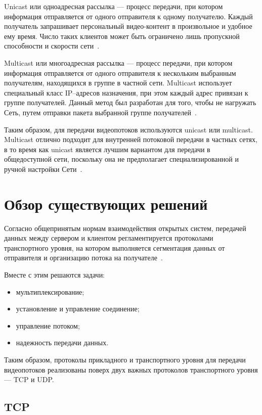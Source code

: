 Unicast или одноадресная рассылка --- процесс передачи, при котором информация отправляется от одного отправителя к одному получателю. Каждый получатель запрашивает персональный видео-контент в произвольное и удобное ему время.
Число таких клиентов может быть ограничено лишь пропускной способности и скорости сети~\cite{method_streaming}.

Multicast или многоадресная рассылка --- процесс передачи, при котором информация отправляется от одного отправителя к нескольким выбранным получателям, находящихся в группе в частной сети.  Multicast использует специальный класс IP--адресов назначения, при этом каждый адрес привязан к группе получателей. Данный метод был разработан для того, чтобы не нагружать Сеть, путем отправки пакета выбранной группе получателей~\cite{method_streaming}. 

Таким образом, для передачи видеопотоков используются unicast или multicast. Multicast отлично подходит для внутренней потоковой передачи в частных сетях, в то время как unicast является лучшим вариантом для передачи в общедоступной сети, поскольку она не предполагает специализированной и ручной настройки Сети~\cite{differece_method_streaming_1}.

\chapter{Обзор существующих решений}

Согласно общепринятым нормам взаимодействия открытых систем, передачей данных между сервером и клиентом регламентируется протоколами транспортного уровня, на котором выполняется сегментация данных от отправителя и организацию потока на получателе~\cite{tcp_ip_reilly,  network_tanenbaum}. 

Вместе с этим решаются задачи:
\begin{itemize}
	\item мультиплексирование;
	\item установление и управление соединение;
	\item управление потоком;
	\item надежность передачи данных.
\end{itemize}

Таким образом, протоколы прикладного и транспортного уровня для передачи видеопотоков реализованы поверх двух важных протоколов транспортного уровня --- TCP и UDP.

\section{TCP}

